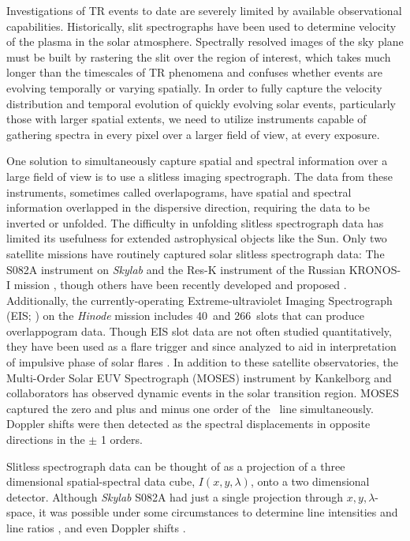     Investigations of TR events to date are severely limited by available observational capabilities. 
    Historically, slit spectrographs have been used to determine velocity of the plasma in the solar atmosphere.   
    Spectrally resolved images of the sky plane must be built by rastering the slit over the region of interest, which takes much longer than the timescales of TR phenomena and confuses whether events are evolving temporally or varying spatially.  
    In order to fully capture the velocity distribution and temporal evolution of quickly evolving solar events, particularly those with larger spatial extents, we need to utilize instruments capable of gathering spectra in every pixel over a larger field of view, at every exposure.
    
    One solution to simultaneously capture spatial and spectral information over a large field of view is to use a slitless imaging spectrograph.  
    The data from these instruments, sometimes called overlapograms, have spatial and spectral information overlapped in the dispersive direction, requiring the data to be inverted or unfolded.
    The difficulty in unfolding slitless spectrograph data has limited its usefulness for extended astrophysical objects like the Sun. 
    Only two satellite missions have routinely captured solar slitless spectrograph data: The S082A instrument on {\it Skylab} \citep{Tousey1973} and the Res-K instrument of the Russian KRONOS-I mission \citep{Zhitnik1998}, though others have been recently developed and proposed \citep{winebarger2019,golub2020}. 
    Additionally, the currently-operating Extreme-ultraviolet Imaging Spectrograph (EIS; \citet{culhane2007}) on the {\it Hinode} mission \citep{kosugi2007} includes 40\arcsec\ and 266\arcsec\ slots that can produce overlappogram data.
    Though EIS slot data are not often studied quantitatively, they have been used as a flare trigger and since analyzed to aid in interpretation of impulsive phase of solar flares \citep{harra2017,harra2020}.
    In addition to these satellite observatories,  the Multi-Order Solar EUV Spectrograph (MOSES) instrument by Kankelborg and collaborators \citep{Kankelborg01,Fox2010,Rust2019} has observed dynamic events in the solar transition region.
    MOSES captured the zero and plus and minus one order of the \heii \ line simultaneously. 
    Doppler shifts were then detected as the spectral displacements in opposite directions in the $\pm$ 1 orders.
    
    Slitless spectrograph data can be thought of as a projection of a three dimensional spatial-spectral data cube, $I(x,y,\lambda)$, onto a two dimensional detector.  
    Although {\it Skylab} S082A had just a single projection through $x,y,\lambda$-space, it was possible under some circumstances to determine line intensities and line ratios \cite[e.g.,][]{Keenan1988, Tayal1989, Keenan2006}, and even Doppler shifts \citep{MariskaDoppler1992}. 

